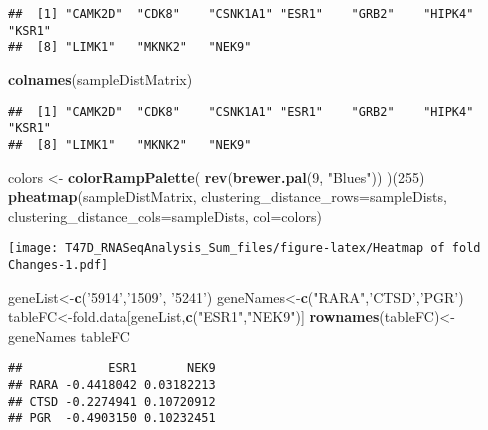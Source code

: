 \documentclass[]{article}
\newenvironment{Shaded}{\begin{snugshade}}{\end{snugshade}}
\newcommand{\KeywordTok}[1]{\textcolor[rgb]{0.13,0.29,0.53}{\textbf{#1}}}
\newcommand{\DataTypeTok}[1]{\textcolor[rgb]{0.13,0.29,0.53}{#1}}
\newcommand{\DecValTok}[1]{\textcolor[rgb]{0.00,0.00,0.81}{#1}}
\newcommand{\StringTok}[1]{\textcolor[rgb]{0.31,0.60,0.02}{#1}}
\newcommand{\NormalTok}[1]{#1}
\begin{document}
\begin{verbatim}
##  [1] "CAMK2D"  "CDK8"    "CSNK1A1" "ESR1"    "GRB2"    "HIPK4"   "KSR1"   
##  [8] "LIMK1"   "MKNK2"   "NEK9"
\end{verbatim}

\begin{Shaded}
\begin{Highlighting}[]
\KeywordTok{colnames}\NormalTok{(sampleDistMatrix) }
\end{Highlighting}
\end{Shaded}

\begin{verbatim}
##  [1] "CAMK2D"  "CDK8"    "CSNK1A1" "ESR1"    "GRB2"    "HIPK4"   "KSR1"   
##  [8] "LIMK1"   "MKNK2"   "NEK9"
\end{verbatim}

\begin{Shaded}
\begin{Highlighting}[]
\NormalTok{colors <-}\StringTok{ }\KeywordTok{colorRampPalette}\NormalTok{( }\KeywordTok{rev}\NormalTok{(}\KeywordTok{brewer.pal}\NormalTok{(}\DecValTok{9}\NormalTok{, }\StringTok{"Blues"}\NormalTok{)) )(}\DecValTok{255}\NormalTok{)}
\KeywordTok{pheatmap}\NormalTok{(sampleDistMatrix,}
         \DataTypeTok{clustering_distance_rows=}\NormalTok{sampleDists,}
         \DataTypeTok{clustering_distance_cols=}\NormalTok{sampleDists,}
         \DataTypeTok{col=}\NormalTok{colors)}
\end{Highlighting}
\end{Shaded}

\texttt{[image: T47D\_RNASeqAnalysis\_Sum\_files/figure-latex/Heatmap of fold Changes-1.pdf]}

\begin{Shaded}
\begin{Highlighting}[]
\NormalTok{geneList<-}\KeywordTok{c}\NormalTok{(}\StringTok{'5914'}\NormalTok{,}\StringTok{'1509'}\NormalTok{, }\StringTok{'5241'}\NormalTok{)}
\NormalTok{geneNames<-}\KeywordTok{c}\NormalTok{(}\StringTok{"RARA"}\NormalTok{,}\StringTok{'CTSD'}\NormalTok{,}\StringTok{'PGR'}\NormalTok{)}
\NormalTok{tableFC<-fold.data[geneList,}\KeywordTok{c}\NormalTok{(}\StringTok{"ESR1"}\NormalTok{,}\StringTok{"NEK9"}\NormalTok{)]}
\KeywordTok{rownames}\NormalTok{(tableFC)<-geneNames}
\NormalTok{tableFC}
\end{Highlighting}
\end{Shaded}

\begin{verbatim}
##            ESR1       NEK9
## RARA -0.4418042 0.03182213
## CTSD -0.2274941 0.10720912
## PGR  -0.4903150 0.10232451
\end{verbatim}
\end{document}
